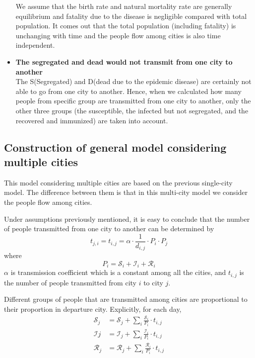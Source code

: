 \begin{itemize}
	      We assume that the birth rate and natural mortality rate are generally equilibrium and fatality due to the disease is negligible compared with total population. It comes out that the total population (including fatality) is unchanging with time and the people flow among cities is also time independent.

	\item \textbf{The segregated and dead would not transmit from one city to another}\\
	      The S(Segregated) and D(dead due to the epidemic disease) are certainly not able to go from one city to another. Hence, when we calculated how many people from specific group are transmitted from one city to another, only the other three groups (the susceptible, the infected but not segregated, and the recovered and immunized) are taken into account.
\end{itemize}

\subsection{Construction of general model considering multiple cities}
This model considering multiple cities are based on the previous single-city model. The difference between them is that in this multi-city model we consider the people flow among cities.

Under assumptions previously mentioned, it is easy to conclude that the number of people transmitted from one city to another can be determined by
\begin{equation}
	t_{j,i} = t_{i,j}=\alpha \cdot\frac{1}{d_{i,j}}\cdot P_{i}\cdot P_{j}
\end{equation}
where
\begin{equation}
	P_{i}=\mathcal{S}_{i}+\mathcal{I}_{i}+\mathcal{R}_{i}
\end{equation}
$\alpha$ is transmission coefficient which is a constant among all the cities, and $t_{i,j}$ is the number of people transmitted from city $i$ to city $j$.

Different groups of people that are transmitted among cities are proportional to their proportion in departure city. Explicitly, for each day,
\begin{align}\label{group}
	\mathcal{S}_{j} & =\mathcal{S}_{j}+\sum_i \frac{\mathcal{S}_{i}}{P_{i}}\cdot t_{i,j} \\
	\mathcal{I}{j}  & =\mathcal{I}_{j}+\sum_i \frac{\mathcal{I}_{i}}{P_{i}}\cdot t_{i,j} \\
	\mathcal{R}_{j} & =\mathcal{R}_{j}+\sum_i \frac{\mathcal{R}_{i}}{P_{i}}\cdot t_{i,j}
\end{align}

